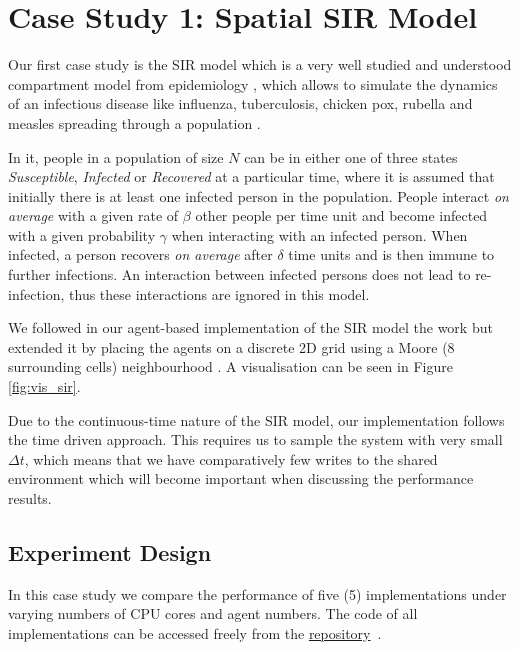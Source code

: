 \section{Case Study 1: Spatial SIR Model} %
\label{sec:cs_sir}

Our first case study is the SIR model which is a very well studied and understood compartment model from epidemiology \cite{kermack_contribution_1927}, which allows to simulate the dynamics of an infectious disease like influenza, tuberculosis, chicken pox, rubella and measles spreading through a population \cite{enns_its_2010}.

In it, people in a population of size $N$ can be in either one of three states \textit{Susceptible}, \textit{Infected} or \textit{Recovered} at a particular time, where it is assumed that initially there is at least one infected person in the population. People interact \textit{on average} with a given rate of $\beta$ other people per time unit and become infected with a given probability $\gamma$ when interacting with an infected person. When infected, a person recovers \textit{on average} after $\delta$ time units and is then immune to further infections. An interaction between infected persons does not lead to re-infection, thus these interactions are ignored in this model. 

We followed in our agent-based implementation of the SIR model the work \cite{macal_agent-based_2010} but extended it by placing the agents on a discrete 2D grid using a Moore (8 surrounding cells) neighbourhood \cite{thaler_pure_2018}. A visualisation can be seen in Figure \ref{fig:vis_sir}.

Due to the continuous-time nature of the SIR model, our implementation follows the time driven \cite{meyer_event-driven_2014} approach. This requires us to sample the system with very small $\Delta t$, which means that we have comparatively few writes to the shared environment which will become important when discussing the performance results.

\subsection{Experiment Design}
In this case study we compare the performance of five (5) implementations under varying numbers of CPU cores and agent numbers. The code of all implementations can be accessed freely from the \href{https://github.com/thalerjonathan/haskell-stm-sir}{repository}~\cite{thaler_stm_sir_repository}.

